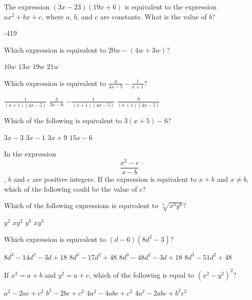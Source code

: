 \question[1]
The expression $(3x-23)(19x+6)$ is equivalent to the expression $ax^{2}+bx+c$, where $a$, $b$, and $c$ are constants. What is the value of $b$?
\begin{solution}
-419
\end{solution}



\newpage



\question[1]
Which expression is equivalent to $20w-(4w+3w)$?
\begin{choices}
  \choice $10w$
  \CorrectChoice $13w$
  \choice $19w$
  \choice $21w$
\end{choices}

\question[1]
Which expression is equivalent to $\frac{4}{4x-5}-\frac{1}{x+1}$?
\begin{choices}
  \choice $\frac{1}{(x+1)(4x-5)}$
  \choice $\frac{3}{3x-6}$
  \choice $-\frac{1}{(x+1)(4x-5)}$
  \CorrectChoice $\frac{9}{(x+1)(4x-5)}$
\end{choices}

\question[1]
Which of the following is equivalent to $3(x+5)-6$?
\begin{choices}
  \choice $3x-3$
  \choice $3x-1$
  \CorrectChoice $3x+9$
  \choice $15x-6$
\end{choices}

\question[1]
In the expression $$\frac{x^{2}-c}{x-b}$$, $b$ and $c$ are positive integers. If the expression is equivalent to $x+b$ and $x \neq b$, which of the following could be the value of $c$?
\begin{choices}
\end{choices}



\newpage



\question[1]
Which of the following expressions is equivalent to $\sqrt[3]{x^3y^6}$?
\begin{choices}
  \choice $y^{2}$
  \CorrectChoice $xy^{2}$
  \choice $y^{3}$
  \choice $xy^{3}$
\end{choices}

\question[1]
Which expression is equivalent to $(d-6)(8d^{2}-3)$?
\begin{choices}
  \choice $8d^{3}-14d^{2}-3d+18$
  \choice $8d^{3}-17d^{2}+48$
  \CorrectChoice $8d^{3}-48d^{2}-3d+18$
  \choice $8d^{3}-51d^{2}+48$
\end{choices}

\question[1]
If $x^{2}=a+b$ and $y^{2}=a+c$, which of the following is equal to $(x^{2}-y^{2})^{2}$?
\begin{choices}
  \choice $a^{2}-2ac+c^{2}$
  \CorrectChoice $b^{2}-2bc+c^{2}$
  \choice $4a^{2}-4abc+c^{2}$
  \choice $4a^{2}-2abc+b^{2}c^{2}$
\end{choices}

